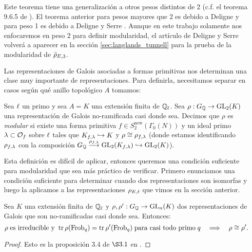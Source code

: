 Este teorema tiene una generalizaci\'on a otros pesos distintos de 2 (c.f. el teorema 9.6.5 de \cite{DiamondShurmanAFCIMF}). El teorema anterior para pesos mayores que 2 es debido a Deligne \cite{DeligneFMERLA} y para peso 1 es debido a Deligne y Serre \cite{DeligneSerreFMDP1}. Aunque en este trabajo solamente nos enfocaremos en peso 2 para definir modularidad, el art\'iculo de Deligne y Serre volver\'a a aparecer en la secci\'on \ref{sec:langlands_tunnell} para la prueba de la modularidad de $\bar{\rho}_{E,3}$.

Las representaciones de Galois asociadas a formas primitivas nos determinan una clase muy importante de representaciones. Para definirla, necesitamos separar en casos seg\'un qu\'e anillo topol\'ogico $A$ tomamos:

\begin{defin}\label{def:modularidad_rho_ext_finita}
  Sea $\ell$ un primo y sea $A=K$ una extensi\'on finita de $\mathbb{Q}_{\ell}$. Sea $\rho:G_{\mathbb{Q}}\rightarrow\mathrm{GL}_2(K)$ una representaci\'on de Galois no-ramificada casi donde sea. Decimos que $\rho$ es \emph{modular} si existe una forma primitiva $f\in S_2^{\mathrm{new}}(\Gamma_0(N))$ y un ideal primo $\lambda\subset\mathcal{O}_{f}$ sobre $\ell$ tales que $K_{f,\lambda}\hookrightarrow K$ y $\rho\cong\rho_{f,\lambda}$ (donde estamos identificando $\rho_{f,\lambda}$ con la composici\'on $G_{\mathbb{Q}}\overset{\rho_{f,\lambda}}{\longrightarrow}\mathrm{GL}_2(K_{f,\lambda})\hookrightarrow\mathrm{GL}_2(K)$).
\end{defin}

Esta definici\'on es dif\'icil de aplicar, entonces queremos una condici\'on suficiente para modularidad que sea m\'as pr\'actico de verificar. Primero enunciamos una condici\'on suficiente para determinar cuando dos representaciones son isomorfas  y luego la aplicamos a las representaciones $\rho_{E,\ell}$ que vimos en la secci\'on anterior.

\begin{prop}\label{prop:cond_iso_de_rep}
  Sea $K$ una extensi\'on finita de $\mathbb{Q}_\ell$ y $\rho,\rho':G_{\mathbb{Q}}\rightarrow\mathrm{GL}_n(K)$ dos representaciones de Galois que son no-ramificadas casi donde sea. Entonces:
  \[
    \rho\;\text{es irreducible y}\;\;
    \mathrm{tr}\,\rho(\mathrm{Frob}_q)=\mathrm{tr}\,\rho'(\mathrm{Frob}_q)\;\text{para casi todo primo}\; q
    \quad\Longrightarrow\quad \rho\cong\rho'.
  \]
\end{prop}
\begin{proof}
  Esto es la proposici\'on 3.4 de $\S3.1$ en \cite{SaitoFLTTP}.
\end{proof}

